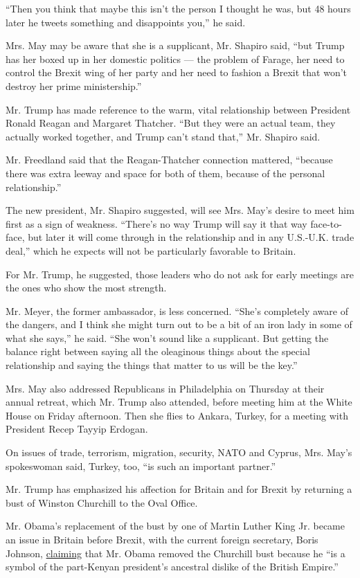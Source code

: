 ``Then you think that maybe this isn't the person I thought he was, but
48 hours later he tweets something and disappoints you,'' he said.

Mrs. May may be aware that she is a supplicant, Mr. Shapiro said, ``but
Trump has her boxed up in her domestic politics --- the problem of
Farage, her need to control the Brexit wing of her party and her need to
fashion a Brexit that won't destroy her prime ministership.''

Mr. Trump has made reference to the warm, vital relationship between
President Ronald Reagan and Margaret Thatcher. ``But they were an actual
team, they actually worked together, and Trump can't stand that,'' Mr.
Shapiro said.

Mr. Freedland said that the Reagan-Thatcher connection mattered,
``because there was extra leeway and space for both of them, because of
the personal relationship.''

The new president, Mr. Shapiro suggested, will see Mrs. May's desire to
meet him first as a sign of weakness. ``There's no way Trump will say it
that way face-to-face, but later it will come through in the
relationship and in any U.S.-U.K. trade deal,'' which he expects will
not be particularly favorable to Britain.

For Mr. Trump, he suggested, those leaders who do not ask for early
meetings are the ones who show the most strength.

Mr. Meyer, the former ambassador, is less concerned. ``She's completely
aware of the dangers, and I think she might turn out to be a bit of an
iron lady in some of what she says,'' he said. ``She won't sound like a
supplicant. But getting the balance right between saying all the
oleaginous things about the special relationship and saying the things
that matter to us will be the key.''

Mrs. May also addressed Republicans in Philadelphia on Thursday at their
annual retreat, which Mr. Trump also attended, before meeting him at the
White House on Friday afternoon. Then she flies to Ankara, Turkey, for a
meeting with President Recep Tayyip Erdogan.

On issues of trade, terrorism, migration, security, NATO and Cyprus,
Mrs. May's spokeswoman said, Turkey, too, ``is such an important
partner.''

Mr. Trump has emphasized his affection for Britain and for Brexit by
returning a bust of Winston Churchill to the Oval Office.

Mr. Obama's replacement of the bust by one of Martin Luther King Jr.
became an issue in Britain before Brexit, with the current foreign
secretary, Boris Johnson,
\href{https://www.nytimes.com/2016/04/23/world/europe/obama-britain-visit.html?_r=0}{claiming}
that Mr. Obama removed the Churchill bust because he ``is a symbol of
the part-Kenyan president's ancestral dislike of the British Empire.''

